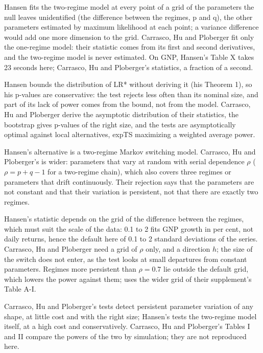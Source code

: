 Hansen fits the two-regime model at every point of a grid of the parameters the null leaves unidentified (the difference between the regimes, p and q), the other parameters estimated by maximum likelihood at each point; a variance difference would add one more dimension to the grid. Carrasco, Hu and Ploberger fit only the one-regime model: their statistic comes from its first and second derivatives, and the two-regime model is never estimated. On GNP, Hansen's Table X takes 23 seconds here; Carrasco, Hu and Ploberger's statistics, a fraction of a second.

Hansen bounds the distribution of LR* without deriving it (his Theorem 1), so his p-values are conservative: the test rejects less often than its nominal size, and part of its lack of power comes from the bound, not from the model. Carrasco, Hu and Ploberger derive the asymptotic distribution of their statistics, the bootstrap gives p-values of the right size, and the tests are asymptotically optimal against local alternatives, expTS maximizing a weighted average power.

Hansen's alternative is a two-regime Markov switching model. Carrasco, Hu and Ploberger's is wider: parameters that vary at random with serial dependence $\rho$ ($\rho=p+q-1$ for a two-regime chain), which also covers three regimes or parameters that drift continuously. Their rejection says that the parameters are not constant and that their variation is persistent, not that there are exactly two regimes.

Hansen's statistic depends on the grid of the difference between the regimes, which must suit the scale of the data: 0.1 to 2 fits GNP growth in per cent, not daily returns, hence the default here of 0.1 to 2 standard deviations of the series. Carrasco, Hu and Ploberger need a grid of $\rho$ only, and a direction $h$; the size of the switch does not enter, as the test looks at small departures from constant parameters. Regimes more persistent than $\rho=0.7$ lie outside the default grid, which lowers the power against them;  uses the wider grid of their supplement's Table A-I.

Carrasco, Hu and Ploberger's tests detect persistent parameter variation of any shape, at little cost and with the right size; Hansen's tests the two-regime model itself, at a high cost and conservatively. Carrasco, Hu and Ploberger's Tables I and II compare the powers of the two by simulation; they are not reproduced here.


